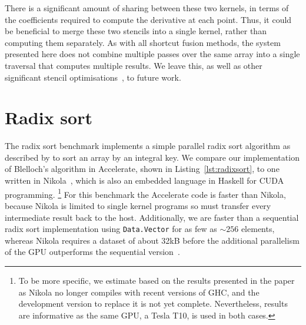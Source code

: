 There is a significant amount of sharing between these two kernels, in terms of
the coefficients required to compute the derivative at each point. Thus, it
could be beneficial to merge these two stencils into a single kernel, rather
than computing them separately. As with all shortcut fusion methods, the system
presented here does not combine multiple passes over the same array into a
single traversal that computes multiple results. We leave this, as well as other
significant stencil
optimisations~\cite{Henretty:2013wb,Kamil:2006un,Lesniak:2010}, to future work.



\section{Radix sort}

The radix sort benchmark implements a simple parallel radix sort algorithm as
described by \citet{Blelloch:1990vl} to sort an array by an integral key. We
compare our implementation of Blelloch's algorithm in Accelerate, shown in
Listing~\ref{lst:radixsort}, to one written in Nikola~\cite{Mainland:2010vj},
which is also an embedded language in Haskell for CUDA programming.%
\footnote{To be more specific, we estimate based on the results presented in the
paper~\cite{Mainland:2010vj} as Nikola no longer compiles with recent versions
of GHC, and the development version to replace it is not yet complete.
Nevertheless, results are informative as the same GPU, a Tesla T10, is used in
both cases.}
For this benchmark the Accelerate code is faster than Nikola, because Nikola is
limited to single kernel programs so must transfer every intermediate result
back to the host. Additionally, we are faster than a sequential radix sort
implementation using \texttt{Data.Vector} for as few as $\sim256$ elements,
whereas Nikola requires a dataset of about 32kB before the additional
parallelism of the GPU outperforms the sequential
version~\cite{Mainland:2010vj}.

